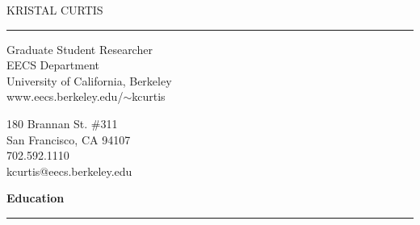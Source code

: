\documentclass[11pt]{article}
\title{}
\author{}
\date{}
\newcommand{\head}[1]{
{\bf #1} \\
\rule{\textwidth}{0.01 in}

\vspace{-0.35 in}

}
\begin{document}

% 




\begin{center}{\Huge KRISTAL CURTIS} \end{center}
\rule{\textwidth}{0.01 in}

\begin{minipage}{0.5 \textwidth}
\begin{flushleft}
Graduate Student Researcher \\
EECS Department\\
University of California, Berkeley \\
www.eecs.berkeley.edu/$\sim$kcurtis
\ 
\end{flushleft}
\end{minipage}
\begin{minipage}{0.5 \textwidth}
\begin{flushright}
180 Brannan St. \#311 \\
San Francisco, CA 94107 \\
702.592.1110\\
kcurtis@eecs.berkeley.edu\\
\end{flushright}
\end{minipage}
\vspace{0.1 in}


\head{Education}
\end{document}
